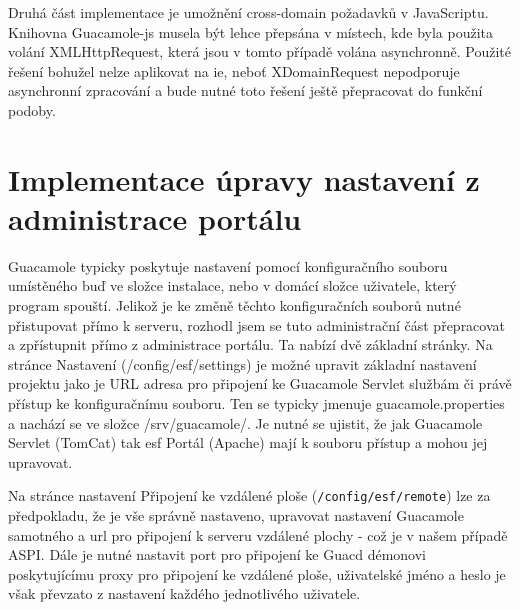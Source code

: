 Druhá část implementace je umožnění cross-domain požadavků v JavaScriptu. Knihovna Guacamole-js musela být lehce přepsána v místech, kde byla použita volání XMLHttpRequest, která jsou v tomto případě volána asynchronně. Použité řešení bohužel nelze aplikovat na \gls{ie}, neboť XDomainRequest nepodporuje asynchronní zpracování a bude nutné toto řešení ještě přepracovat do funkční podoby.

\section{Implementace úpravy nastavení z administrace portálu}
Guacamole typicky poskytuje nastavení pomocí konfiguračního souboru umístěného buď ve složce instalace, nebo v domácí složce uživatele, který program spouští. Jelikož je ke změně těchto konfiguračních souborů nutné přistupovat přímo k serveru, rozhodl jsem se tuto administrační část přepracovat a zpřístupnit přímo z administrace portálu. Ta nabízí dvě základní stránky. Na stránce Nastavení (/config/esf/settings) je možné upravit základní nastavení projektu jako je URL adresa pro připojení ke Guacamole Servlet službám či právě přístup ke konfiguračnímu souboru. Ten se typicky jmenuje guacamole.properties a nachází se ve složce /srv/guacamole/. Je nutné se ujistit, že jak Guacamole Servlet (TomCat) tak \gls{esf} Portál (Apache) mají k souboru přístup a mohou jej upravovat.

Na stránce nastavení Připojení ke vzdálené ploše (\texttt{/config/esf/remote}) lze za předpokladu, že je vše správně nastaveno, upravovat nastavení Guacamole samotného a url pro připojení k serveru vzdálené plochy - což je v našem případě ASPI. Dále je nutné nastavit port pro připojení ke Guacd démonovi poskytujícímu proxy pro připojení ke vzdálené ploše, uživatelské jméno a heslo je však převzato z nastavení každého jednotlivého uživatele.

